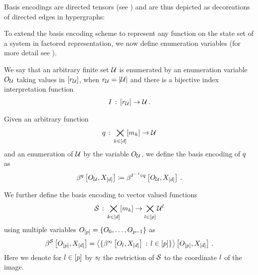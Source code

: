 Basis encodings are directed tensors (see ) and are thus depicted as decoreations of directed edges in hypergraphs:
\begin{center}
	
\end{center}

To extend the basis encoding scheme to represent any function on the state set of a system in factored representation, we now define enumeration variables (for more detail see ).

\begin{definition}\label{def:indexinterpretationNotation}
    We say that an arbitrary finite set $\mathcal{U}$ is enumerated by an enumeration variable $O_{\mathcal{U}}$ taking values in $[r_{\mathcal{U}}]$, when $r_{\mathcal{U}}=\left|\mathcal{U}\right|$ and there is a bijective index interpretation function
    \begin{align*}
        I \,:\, [r_{\mathcal{U}}] \rightarrow \mathcal{U} \, .
    \end{align*}
\end{definition}

Given an arbitrary function
\begin{align*}
	q \,:\, \bigtimes_{k\in[d]}[m_{k}] \rightarrow \mathcal{U}
\end{align*}
and an enumeration of $\mathcal{U}$ by the variable $O_{\mathcal{U}}$, we define the basis encoding of $q$ as
\begin{align*}
	\beta^{q}\left[O_{\mathcal{U}},X_{[d]}\right]
	\coloneqq \beta^{I^{-1}\circ q}\left[O_{\mathcal{U}},X_{[d]}\right] \, .
\end{align*}

We further define the basis encoding to vector valued functions
\begin{align*}
	\mathcal{S} \,:\, \bigtimes_{k\in[d]}[m_{k}] \rightarrow \bigtimes_{l\in[p]} \mathcal{U}^{l}
\end{align*}
using multiple variables $O_{[p]}=\{O_{0},\ldots,O_{p-1}\}$ as
\begin{align*}
	\beta^{\mathcal{S}}\left[O_{[p]},X_{[d]}\right]
	= \left\langle \{\beta^{s_{l}}\left[O_{l},X_{[d]}\right]\,:\,l\in[p]\}\right\rangle \left[ O_{[p]},X_{[d]} \right] \, .
\end{align*}
Here we denote for $l\in[p]$ by $s_{l}$ the restriction of $\mathcal{S}$ to the coordinate $l$ of the image.

